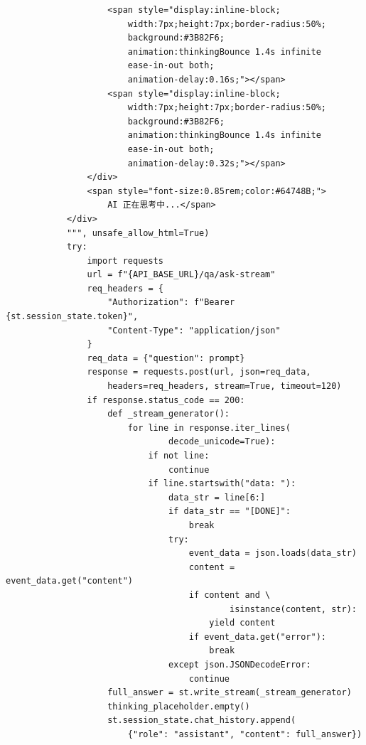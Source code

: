 \documentclass[a4paper,10pt]{article}
\begin{document}
\begin{lstlisting}
                    <span style="display:inline-block;
                        width:7px;height:7px;border-radius:50%;
                        background:#3B82F6;
                        animation:thinkingBounce 1.4s infinite
                        ease-in-out both;
                        animation-delay:0.16s;"></span>
                    <span style="display:inline-block;
                        width:7px;height:7px;border-radius:50%;
                        background:#3B82F6;
                        animation:thinkingBounce 1.4s infinite
                        ease-in-out both;
                        animation-delay:0.32s;"></span>
                </div>
                <span style="font-size:0.85rem;color:#64748B;">
                    AI 正在思考中...</span>
            </div>
            """, unsafe_allow_html=True)
            try:
                import requests
                url = f"{API_BASE_URL}/qa/ask-stream"
                req_headers = {
                    "Authorization": f"Bearer {st.session_state.token}",
                    "Content-Type": "application/json"
                }
                req_data = {"question": prompt}
                response = requests.post(url, json=req_data,
                    headers=req_headers, stream=True, timeout=120)
                if response.status_code == 200:
                    def _stream_generator():
                        for line in response.iter_lines(
                                decode_unicode=True):
                            if not line:
                                continue
                            if line.startswith("data: "):
                                data_str = line[6:]
                                if data_str == "[DONE]":
                                    break
                                try:
                                    event_data = json.loads(data_str)
                                    content = event_data.get("content")
                                    if content and \
                                            isinstance(content, str):
                                        yield content
                                    if event_data.get("error"):
                                        break
                                except json.JSONDecodeError:
                                    continue
                    full_answer = st.write_stream(_stream_generator)
                    thinking_placeholder.empty()
                    st.session_state.chat_history.append(
                        {"role": "assistant", "content": full_answer})

\end{lstlisting}
\end{document}
